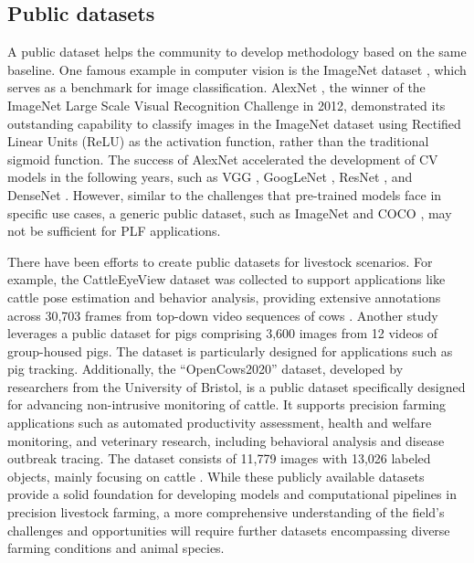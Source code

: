 \subsection*{Public datasets}

A public dataset helps the community to develop methodology based on the same baseline. One famous example in computer vision is the ImageNet dataset \cite{deng2009imagenet}, which serves as a benchmark for image classification. AlexNet \cite{krizhevsky2017imagenet}, the winner of the ImageNet Large Scale Visual Recognition Challenge in 2012, demonstrated its outstanding capability to classify images in the ImageNet dataset using Rectified Linear Units (ReLU) as the activation function, rather than the traditional sigmoid function. The success of AlexNet accelerated the development of CV models in the following years, such as VGG \cite{karen2014very}, GoogLeNet \cite{szegedy2015going}, ResNet \cite{targ2016resnet}, and DenseNet \cite{huang2017densely}. However, similar to the challenges that pre-trained models face in specific use cases, a generic public dataset, such as ImageNet \cite{deng2009imagenet} and COCO \cite{lin2014microsoft}, may not be sufficient for PLF applications.

There have been efforts to create public datasets for livestock scenarios. For example, the CattleEyeView dataset was collected to support applications like cattle pose estimation and behavior analysis, providing extensive annotations across 30,703 frames from top-down video sequences of cows \cite{ong2023cattleeyeview}. Another study \cite{t2020long} leverages a public dataset for pigs comprising 3,600 images from 12 videos of group-housed pigs. The dataset is particularly designed for applications such as pig tracking. Additionally, the ``OpenCows2020'' dataset, developed by researchers from the University of Bristol, is a public dataset specifically designed for advancing non-intrusive monitoring of cattle. It supports precision farming applications such as automated productivity assessment, health and welfare monitoring, and veterinary research, including behavioral analysis and disease outbreak tracing. The dataset consists of 11,779 images with 13,026 labeled objects, mainly focusing on cattle \cite{visualization-tools-for-opencows2020-dataset}. While these publicly available datasets provide a solid foundation for developing models and computational pipelines in precision livestock farming, a more comprehensive understanding of the field's challenges and opportunities will require further datasets encompassing diverse farming conditions and animal species.

